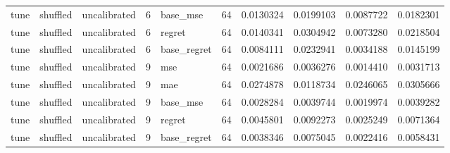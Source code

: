 \begin{tabular}{lllrlrrrrr}
tune & shuffled & uncalibrated & 6 & base_mse & 64 & 0.0130324 & 0.0199103 & 0.0087722 & 0.0182301 \\
tune & shuffled & uncalibrated & 6 & regret & 64 & 0.0140341 & 0.0304942 & 0.0073280 & 0.0218504 \\
tune & shuffled & uncalibrated & 6 & base_regret & 64 & 0.0084111 & 0.0232941 & 0.0034188 & 0.0145199 \\
tune & shuffled & uncalibrated & 9 & mse & 64 & 0.0021686 & 0.0036276 & 0.0014410 & 0.0031713 \\
tune & shuffled & uncalibrated & 9 & mae & 64 & 0.0274878 & 0.0118734 & 0.0246065 & 0.0305666 \\
tune & shuffled & uncalibrated & 9 & base_mse & 64 & 0.0028284 & 0.0039744 & 0.0019974 & 0.0039282 \\
tune & shuffled & uncalibrated & 9 & regret & 64 & 0.0045801 & 0.0092273 & 0.0025249 & 0.0071364 \\
tune & shuffled & uncalibrated & 9 & base_regret & 64 & 0.0038346 & 0.0075045 & 0.0022416 & 0.0058431 \\
\bottomrule
\end{tabular}
